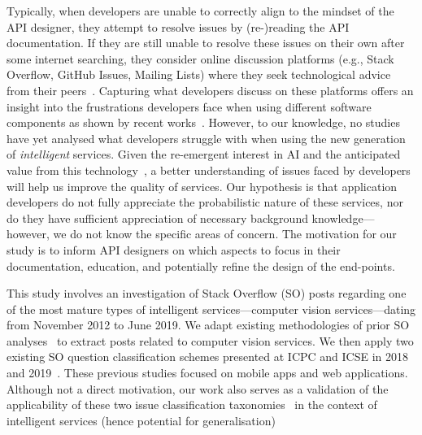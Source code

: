 Typically, when developers are unable to correctly align to the mindset of the API designer, they attempt to resolve issues by \mbox{(re-)reading} the API documentation. If they are still unable to resolve these issues on their own after some internet searching, they consider online discussion platforms (e.g., Stack Overflow, GitHub Issues, Mailing Lists) where they seek technological advice from their peers~\citep{Aghajani:2019bo}.
Capturing what developers discuss on these platforms offers an insight into the frustrations developers face when using different software components as shown by recent works~\citep{Rosen:2016uk,Beyer:2014ec,Kavaler:2013uh,Wang:2013ub,Stevens:2013vf}.
However, to our knowledge, no studies have yet analysed what developers struggle with when using the new generation of \textit{intelligent} services. Given the re-emergent interest in AI and the anticipated value from this technology~\citep{LoGiudice:2016wf}, a better understanding of issues faced by developers will help us improve the quality of services. Our hypothesis is that application developers do not fully appreciate the probabilistic nature of these services, nor do they have sufficient appreciation of necessary background knowledge---however, we do not know the specific areas of concern. The motivation for our study is to inform API designers on which aspects to focus in their documentation, education, and potentially refine the design of the end-points.

This study involves an investigation of \NumPostsCategorised{} Stack Overflow (SO) posts regarding one of the most mature types of intelligent services---computer vision services---dating from November 2012 to June 2019. We adapt existing methodologies of prior SO analyses~\citep{Tahir:2018ks, Beyer:2014ec} to extract posts related to computer vision services. We then apply two existing SO question classification schemes presented at ICPC and ICSE in 2018 and 2019~\citep{Aghajani:2019bo,Beyer:2018fm}. These previous studies focused on mobile apps and web applications. Although not a direct motivation, our work also serves as a validation of the applicability of these two issue classification taxonomies~\citep{Aghajani:2019bo,Beyer:2018fm} in the context of intelligent services (hence potential for generalisation)  


